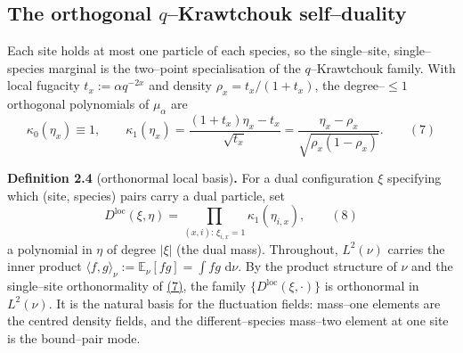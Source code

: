 \documentclass[11pt]{article}
\theoremstyle{plain}
\theoremstyle{definition}
\theoremstyle{remark}
\newcommand{\E}{\mathbb{E}}\newcommand{\PP}{\mathbb{P}}\newcommand{\dd}{\,\mathrm{d}}
\begin{document}
\subsection{The orthogonal \texorpdfstring{$q$}{q}--Krawtchouk self--duality}
Each site holds at most one particle of each species, so the single--site,
single--species marginal is the two--point specialisation of the $q$--Krawtchouk
family. With local fugacity $t_x:=\alpha q^{-2x}$ and density $\rho_x=t_x/(1+t_x)$,
the degree--$\le1$ orthogonal polynomials of $\mu_\alpha$ are
\label{eq_d1}
\begin{equation}
  \kappa_0(\eta_x)\equiv1,\qquad
  \kappa_1(\eta_x)=\frac{(1+t_x)\eta_x-t_x}{\sqrt{t_x}}
  =\frac{\eta_x-\rho_x}{\sqrt{\rho_x(1-\rho_x)}}.\qquad(7)
\end{equation}

\label{def_D}\noindent\textbf{Definition 2.4} (orthonormal local basis)\textbf{.} 
For a dual configuration $\xi$ specifying which (site, species) pairs carry a dual
particle, set
\label{eq_Dfac}
\begin{equation}
  D^{\mathrm{loc}}(\xi,\eta)=\prod_{(x,i):\,\xi_{i,x}=1}\kappa_1(\eta_{i,x}),\qquad(8)
\end{equation}
a polynomial in $\eta$ of degree $|\xi|$ (the dual mass). Throughout, $L^2(\nu)$ carries
the inner product $\langle f,g\rangle_\nu:=\E_\nu[fg]=\int fg\,\dd\nu$. By the product
structure of $\nu$ and the single--site orthonormality of \hyperref[eq_d1]{(7)}, the family
$\{D^{\mathrm{loc}}(\xi,\cdot)\}$ is orthonormal in $L^2(\nu)$. It is the natural
basis for the fluctuation fields: mass--one elements are the centred density fields,
and the different--species mass--two element at one site is the bound--pair mode.
\par
\end{document}
